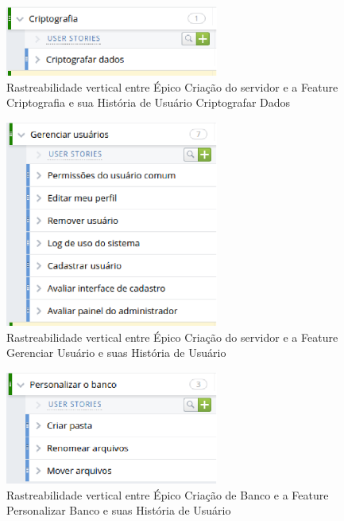   \begin{figure}[!htb]
    \centering
    \includegraphics[width=7cm, keepaspectratio=false]{figuras/rastreabilidade/vertical/feature_criptografia.eps}
    \caption{Rastreabilidade vertical entre Épico Criação do servidor e a Feature Criptografia e sua História de Usuário Criptografar Dados}
  \end{figure}

  \begin{figure}[!htb]
    \centering
    \includegraphics[width=7cm, keepaspectratio=false]{figuras/rastreabilidade/vertical/feature_gerenciar_usuario.eps}
    \caption{Rastreabilidade vertical entre Épico Criação do servidor e a Feature Gerenciar Usuário e suas História de Usuário}
  \end{figure}

  \begin{figure}[!htb]
    \centering
    \includegraphics[width=7cm, keepaspectratio=false]{figuras/rastreabilidade/vertical/feature_personalizar_banco.eps}
    \caption{Rastreabilidade vertical entre Épico Criação de Banco e a Feature Personalizar Banco e suas História de Usuário}
  \end{figure}

